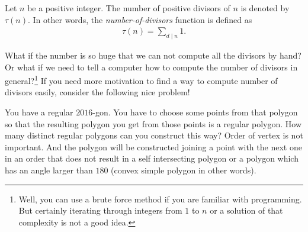 \documentclass[12pt]{subfile}
\begin{document}
			\begin{definition}
				Let $n$ be a positive integer. The number of positive divisors of $n$ is denoted by $\tau(n)$. In other words, the \textit{number-of-divisors} function is defined as
					\begin{align*}
						\tau(n)=\sum_{d\mid n} 1.
					\end{align*}
			\end{definition}
		What if the number is so huge that we can not compute all the divisors by hand? Or what if we need to tell a computer how to compute the number of divisors in general?\footnote{Well, you can use a brute force method if you are familiar with programming. But certainly iterating through integers from $1$ to $n$ or a solution of that complexity is not a good idea.} If you need more motivation to find a way to compute number of divisors easily, consider the following nice problem!
			\begin{problem}
				You have a regular $2016$-gon. You have to choose some points from that polygon so that the resulting polygon you get from those points is a regular polygon. How many distinct regular polygons can you construct this way? Order of vertex is not important. And the polygon will be constructed joining a point with the next one in an order that does not result in a self intersecting polygon or a polygon which has an angle larger than $180$ (convex simple polygon in other words).
			\end{problem}
\end{document}
